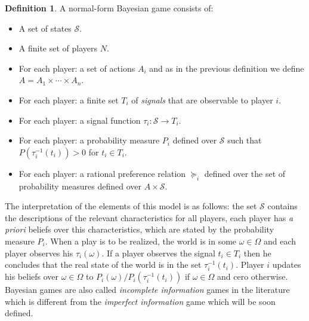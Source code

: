 \documentclass[english,letterpaper,12pt,final]{article}
\theoremstyle{definition}
\newtheorem{defi}{Definition}[section]
\begin{document}
\begin{defi}
A normal-form Bayesian game consists of:
\begin{itemize}
\item A set of states $\mathcal{S}$.
\item A finite set of players $N$.
\item For each player: a set of actions $A_i$ and as in the previous definition we define $A= A_1 \times \cdots \times A_n$.
\item For each player: a finite set $T_i$ of \textit{signals} that are observable to player $i$.
\item For each player: a signal function $\tau_i : \mathcal{S} \to T_i$.
\item For each player: a probability measure $P_i$ defined over $\mathcal{S}$ such that $P(\tau^{-1}_i (t_i)) >0$ for $t_i \in T_i$.
\item For each player: a rational preference relation $\succeq_i$ defined over the set of probability measures defined over $A \times \mathcal{S}$.
\end{itemize}
\end{defi}

The interpretation of the elements of this model is as follows: the set $\mathcal{S}$ contains the descriptions of the relevant characteristics for all players, each player has \textit{a priori} beliefs over this characteristics, which are stated by the probability measure $P_i$. When a play is to be realized, the world is in some $\omega \in \Omega$ and each player observes his $\tau_i (\omega)$. If a player observes the signal $t_i \in T_i$ then he concludes that the real state of the world is in the set $\tau^{-1}_i (t_i)$. Player $i$ updates his beliefs over $\omega \in \Omega$ to $P_i(\omega) / P_i(\tau^{-1}_i (t_i))$ if $\omega \in \Omega$ and cero otherwise. Bayesian games are also called \textit{incomplete information} games in the literature which is different from the \textit{imperfect information} game which will be soon defined.
\end{document}

